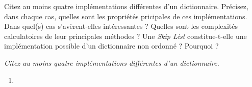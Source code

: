 Citez au moins quatre implémentations différentes d'un dictionnaire.
Précisez, dans chaque cas, quelles sont les propriétés pricipales de ces implémentations.
Dans quel(s) cas s'avèrent-elles intéressantes ?
Quelles sont les complexités calculatoires de leur principales méthodes ?
Une \textit{Skip List} constitue-t-elle une implémentation possible d'un dictionnaire non ordonné ?
Pourquoi ?

\textit{Citez au moins quatre implémentations différentes d'un dictionnaire.}
\begin{enumerate}
	\item 
\end{enumerate}
